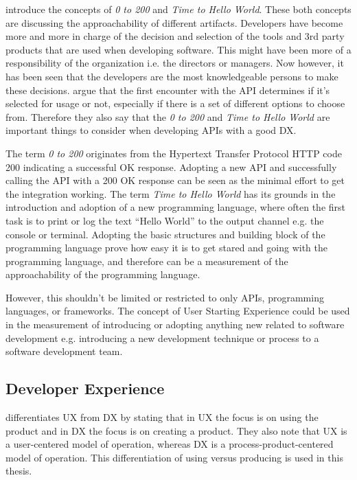 \documentclass[english, 12pt, a4paper, sci, utf8, a-1b, online]{aaltothesis}
\begin{document}
\textcite{api-designers} introduce the concepts of \textit{0 to 200} and \textit{Time to Hello World}. These both concepts are discussing the approachability of different artifacts. Developers have become more and more in charge of the decision and selection of the tools and 3rd party products that are used when developing software. This might have been more of a responsibility of the organization i.e. the directors or managers. Now however, it has been seen that the developers are the most knowledgeable persons to make these decisions. \textcite{api-designers} argue that the first encounter with the API determines if it's selected for usage or not, especially if there is a set of different options to choose from. Therefore they also say that the \textit{0 to 200} and \textit{Time to Hello World} are important things to consider when developing APIs with a good DX.

The term \textit{0 to 200} originates from the Hypertext Transfer Protocol HTTP code 200 indicating a successful OK response. Adopting a new API and successfully calling the API with a 200 OK response can be seen as the minimal effort to get the integration working. The term \textit{Time to Hello World} has its grounds in the introduction and adoption of a new programming language, where often the first task is to print or log the text ``Hello World'' to the output channel e.g. the console or terminal. Adopting the basic structures and building block of the programming language prove how easy it is to get stared and going with the programming language, and therefore can be a measurement of the approachability of the programming language.

However, this shouldn't be limited or restricted to only APIs, programming languages, or frameworks. The concept of User Starting Experience could be used in the measurement of introducing or adopting anything new related to software development e.g. introducing a new development technique or process to a software development team.


\subsection{Developer Experience}


\textcite[167]{moilanen2018api} differentiates UX from DX by stating that in UX the focus is on using the product and in DX the focus is on creating a product. They also note that UX is a user-centered model of operation, whereas DX is a process-product-centered model of operation. This differentiation of using versus producing is used in this thesis.
\end{document}
